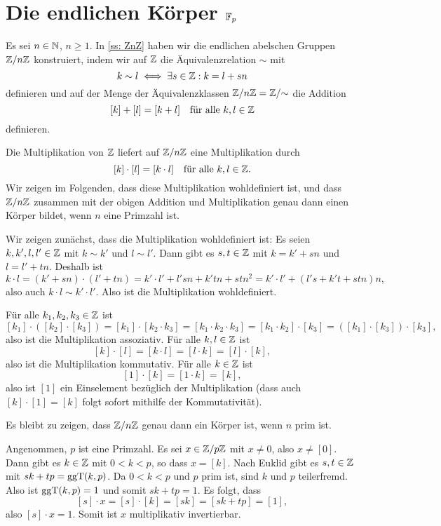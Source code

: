 \section{Die endlichen Körper \texorpdfstring{$\mathbb{F}_p$}{Fp}}\label{sec: the finite fields Fp}
Es sei $n \in \mathbb{N}$, $n \geq 1$. In \ref{ss: ZnZ} haben wir die endlichen abelschen Gruppen $\mathbb{Z}/n\mathbb{Z}$ konstruiert, indem wir auf $\mathbb{Z}$ die Äquivalenzrelation $\sim$ mit
\[
 k \sim l \iff \exists s \in \mathbb{Z} : k = l + sn
\]
definieren und auf der Menge der Äquivalenzklassen $\mathbb{Z}/n\mathbb{Z} = \mathbb{Z}/{\sim}$ die Addition
\[
 [k] + [l] = [k+l]
 \quad
 \text{für alle $k,l \in \mathbb{Z}$}
\]
definieren.

Die Multiplikation von $\mathbb{Z}$ liefert auf $\mathbb{Z}/n\mathbb{Z}$ eine Multiplikation durch
\[
 [k] \cdot [l] = [k \cdot l]
 \quad
 \text{für alle $k,l \in \mathbb{Z}$}.
\]
Wir zeigen im Folgenden, dass diese Multiplikation wohldefiniert ist, und dass $\mathbb{Z}/n\mathbb{Z}$ zusammen mit der obigen Addition und Multiplikation genau dann einen Körper bildet, wenn $n$ eine Primzahl ist.

Wir zeigen zunächst, dass die Multiplikation wohldefiniert ist: Es seien $k, k', l, l' \in \mathbb{Z}$ mit $k \sim k'$ und $l \sim l'$. Dann gibt es $s,t \in \mathbb{Z}$ mit $k = k' + sn$ und $l = l' + tn$. Deshalb ist
\[
 k \cdot l
 = (k' + sn) \cdot (l' + tn)
 = k' \cdot l' + l'sn + k'tn + stn^2
 = k' \cdot l' + (l's + k't + stn)n,
\]
also auch $k \cdot l \sim k' \cdot l'$. Also ist die Multiplikation wohldefiniert.

Für alle $k_1, k_2, k_3 \in \mathbb{Z}$ ist
\[
 [k_1] \cdot ([k_2] \cdot [k_3])
 = [k_1] \cdot [k_2 \cdot k_3]
 = [k_1 \cdot k_2 \cdot k_3]
 = [k_1 \cdot k_2] \cdot [k_3]
 = ([k_1] \cdot [k_3]) \cdot [k_3],
\]
also ist die Multiplikation assoziativ. Für alle $k, l \in \mathbb{Z}$ ist
\[
 [k] \cdot [l]
 = [k \cdot l]
 = [l \cdot k]
 = [l] \cdot [k],
\]
also ist die Multiplikation kommutativ. Für alle $k \in \mathbb{Z}$ ist
\[
 [1] \cdot [k] = [1 \cdot k] = [k],
\]
also ist $[1]$ ein Einselement bezüglich der Multiplikation (dass auch $[k] \cdot [1] = [k]$ folgt sofort mithilfe der Kommutativität).

Es bleibt zu zeigen, dass $\mathbb{Z}/n\mathbb{Z}$ genau dann ein Körper ist, wenn $n$ prim ist.

Angenommen, $p$ ist eine Primzahl. Es sei $x \in \mathbb{Z}/p\mathbb{Z}$ mit $x \neq 0$, also $x \neq [0]$. Dann gibt es $k \in \mathbb{Z}$ mit $0 < k < p$, so dass $x = [k]$. Nach Euklid gibt es $s,t \in \mathbb{Z}$ mit $sk + tp = \mathrm{ggT}(k,p)$. Da $0 < k < p$ und $p$ prim ist, sind $k$ und $p$ teilerfremd. Also ist $\mathrm{ggT}(k,p) = 1$ und somit $sk + tp = 1$. Es folgt, dass
\[
 [s] \cdot x
 = [s] \cdot [k]
 = [sk]
 = [sk + tp]
 = [1],
\]
also $[s] \cdot x = 1$. Somit ist $x$ multiplikativ invertierbar.

